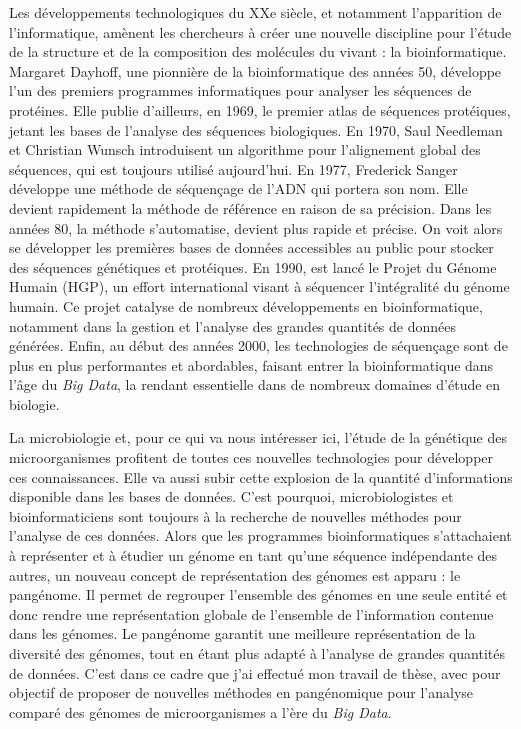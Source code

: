 Les développements technologiques du XXe siècle, et notamment l'apparition de l'informatique, amènent les chercheurs à créer une nouvelle discipline pour l'étude de la structure et de la composition des molécules du vivant : la bioinformatique. Margaret Dayhoff, une pionnière de la bioinformatique des années 50, développe l'un des premiers programmes informatiques pour analyser les séquences de protéines. Elle publie d'ailleurs, en 1969, le premier atlas de séquences protéiques, jetant les bases de l'analyse des séquences biologiques. En 1970, Saul Needleman et Christian Wunsch introduisent un algorithme pour l'alignement global des séquences, qui est toujours utilisé aujourd'hui. En 1977, Frederick Sanger développe une méthode de séquençage de l'ADN qui portera son nom. Elle devient rapidement la méthode de référence en raison de sa précision. Dans les années 80, la méthode s'automatise, devient plus rapide et précise. On voit alors se développer les premières bases de données accessibles au public pour stocker des séquences génétiques et protéiques. En 1990, est lancé le Projet du Génome Humain (HGP), un effort international visant à séquencer l'intégralité du génome humain. Ce projet catalyse de nombreux développements en bioinformatique, notamment dans la gestion et l'analyse des grandes quantités de données générées. Enfin, au début des années 2000, les technologies de séquençage sont de plus en plus performantes et abordables, faisant entrer la bioinformatique dans l'âge du \textit{Big Data}, la rendant essentielle dans de nombreux domaines d'étude en biologie.


La microbiologie et, pour ce qui va nous intéresser ici, l'étude de la génétique des microorganismes profitent de toutes ces nouvelles technologies pour développer ces connaissances. Elle va aussi subir cette explosion de la quantité d'informations disponible dans les bases de données. C'est pourquoi, microbiologistes et bioinformaticiens sont toujours à la recherche de nouvelles méthodes pour l'analyse de ces données. Alors que les programmes bioinformatiques s'attachaient à représenter et à étudier un génome en tant qu'une séquence indépendante des autres, un nouveau concept de représentation des génomes est apparu : le pangénome. Il permet de regrouper l'ensemble des génomes en une seule entité et donc rendre une représentation globale de l'ensemble de l'information contenue dans les génomes. Le pangénome garantit une meilleure représentation de la diversité des génomes, tout en étant plus adapté à l'analyse de grandes quantités de données. C'est dans ce cadre que j'ai effectué mon travail de thèse, avec pour objectif de proposer de nouvelles méthodes en pangénomique pour l'analyse comparé des génomes de microorganismes a l'ère du \textit{Big Data}.
\newline

